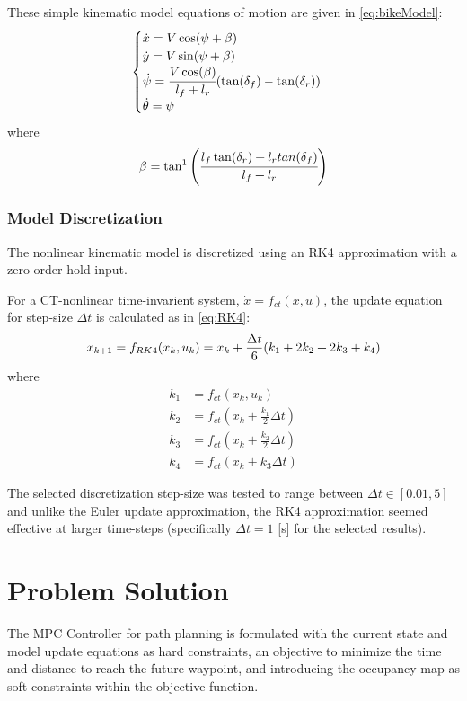 \documentclass[]{IEEEtran}
\begin{document}
These simple kinematic model equations of motion are given in \eqref{eq:bikeModel}:
\begin{equation}\label{eq:bikeModel}
    \begin{cases}
        \dot{x} = V \cos(\psi + \beta)\\
        \dot{y} = V \sin(\psi + \beta)\\
        \dot{\psi} = \cfrac{V \cos(\beta)}{l_f + l_r} \qty(\tan(\delta_f) - \tan(\delta_r))\\
        \dot{\theta} = \psi
    \end{cases}
\end{equation}
where
\begin{equation}
    \beta = \tan^{1}\qty(\cfrac{l_f \tan(\delta_r) + l_r tan(\delta_f)}{l_f + l_r})
\end{equation}

\subsubsection{Model Discretization}
The nonlinear kinematic model is discretized using an RK4 approximation with a zero-order hold input.

For a CT-nonlinear time-invarient system, $\dot{x} = f_{ct}(x,u)$, the update equation for step-size $\Delta t$ is calculated as in \eqref{eq:RK4}:
\begin{equation}\label{eq:RK4}
    x_{k+1} = f_{RK4}(x_k,u_k) = x_{k} + \frac{\Delta t}{6} \qty(k_1 + 2k_2 + 2k_3 + k_4)
\end{equation}
where
\begin{align*}
    k_1 &= f_{ct}(x_k,u_k)\\
    k_2 &= f_{ct}(x_{k} + \frac{k_1}{2} \Delta t)\\
    k_3 &= f_{ct}(x_{k} + \frac{k_2}{2} \Delta t)\\
    k_4 &= f_{ct}(x_{k} + k_3 \Delta t)
\end{align*}

The selected discretization step-size was tested to range between $\Delta t \in [0.01, 5]$ and unlike the Euler update approximation, the RK4 approximation seemed effective at larger time-steps (specifically $\Delta t = 1$ [s] for the selected results).

\section{Problem Solution}
\label{sec:pblm_soln}
The MPC Controller for path planning is formulated with the current state and model update equations as hard constraints, an objective to minimize the time and distance to reach the future waypoint, and introducing the occupancy map as soft-constraints within the objective function.
\end{document}

